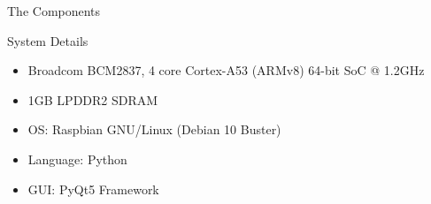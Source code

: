 \documentclass[t]{beamer}
\begin{document}
\begin{frame}{The Components}
    
\end{frame}

\begin{frame}{System Details}
    \begin{itemize}
        \item Broadcom BCM2837, 4 core Cortex-A53 (ARMv8) 64-bit SoC @ 1.2GHz
        \item 1GB LPDDR2 SDRAM
        \item OS: Raspbian GNU/Linux (Debian 10 Buster)
        \item Language: Python
        \item GUI: PyQt5 Framework
    \end{itemize}
\end{frame}
\end{document}
